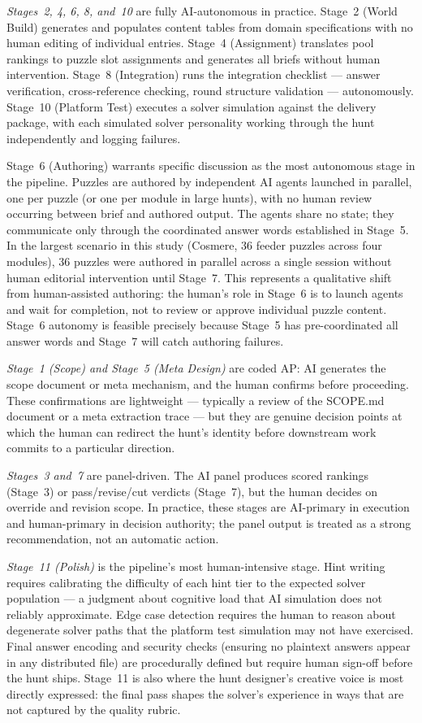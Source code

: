 \emph{Stages~2, 4, 6, 8, and~10} are fully AI-autonomous in practice. Stage~2 (World
Build) generates and populates content tables from domain specifications with no human
editing of individual entries. Stage~4 (Assignment) translates pool rankings to puzzle
slot assignments and generates all briefs without human intervention. Stage~8 (Integration)
runs the integration checklist --- answer verification, cross-reference checking, round
structure validation --- autonomously. Stage~10 (Platform Test) executes a solver
simulation against the delivery package, with each simulated solver personality working
through the hunt independently and logging failures.

Stage~6 (Authoring) warrants specific discussion as the most autonomous stage in the
pipeline. Puzzles are authored by independent AI agents launched in parallel, one per
puzzle (or one per module in large hunts), with no human review occurring between brief
and authored output. The agents share no state; they communicate only through the
coordinated answer words established in Stage~5. In the largest scenario in this
study (Cosmere, 36 feeder puzzles across four modules), 36 puzzles were authored in
parallel across a single session without human editorial intervention until Stage~7. This
represents a qualitative shift from human-assisted authoring: the human's role in Stage~6
is to launch agents and wait for completion, not to review or approve individual puzzle
content. Stage~6 autonomy is feasible precisely because Stage~5 has pre-coordinated all
answer words and Stage~7 will catch authoring failures.

\emph{Stage~1 (Scope) and Stage~5 (Meta Design)} are coded AP: AI generates the scope
document or meta mechanism, and the human confirms before proceeding. These confirmations
are lightweight --- typically a review of the SCOPE.md document or a meta extraction trace
--- but they are genuine decision points at which the human can redirect the hunt's
identity before downstream work commits to a particular direction.

\emph{Stages~3 and~7} are panel-driven. The AI panel produces scored rankings (Stage~3)
or pass/revise/cut verdicts (Stage~7), but the human decides on override and revision
scope. In practice, these stages are AI-primary in execution and human-primary in
decision authority; the panel output is treated as a strong recommendation, not an
automatic action.

\emph{Stage~11 (Polish)} is the pipeline's most human-intensive stage. Hint writing
requires calibrating the difficulty of each hint tier to the expected solver population
--- a judgment about cognitive load that AI simulation does not reliably approximate. Edge
case detection requires the human to reason about degenerate solver paths that the platform
test simulation may not have exercised. Final answer encoding and security checks (ensuring
no plaintext answers appear in any distributed file) are procedurally defined but require
human sign-off before the hunt ships. Stage~11 is also where the hunt designer's creative
voice is most directly expressed: the final pass shapes the solver's experience in ways
that are not captured by the quality rubric.

